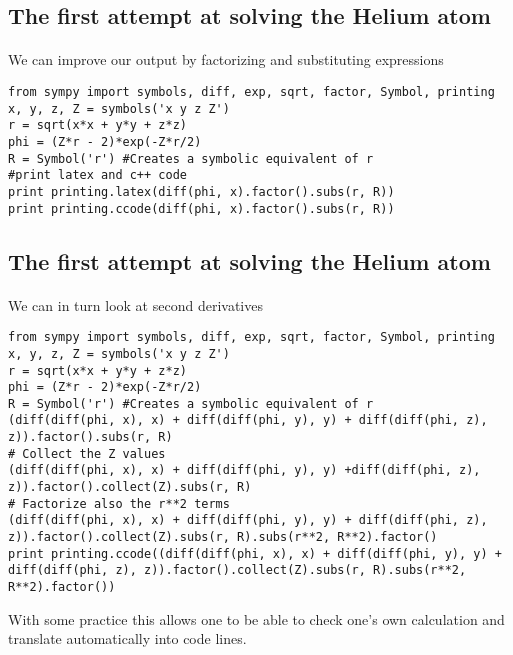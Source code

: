\documentclass[%
twoside,                 %
final,                   %
10pt]{article}
\begin{document}
\subsection*{The first attempt at solving the Helium atom}

\paragraph{}
We can improve our output by factorizing and substituting expressions
\begin{verbatim}
from sympy import symbols, diff, exp, sqrt, factor, Symbol, printing
x, y, z, Z = symbols('x y z Z')
r = sqrt(x*x + y*y + z*z)
phi = (Z*r - 2)*exp(-Z*r/2)
R = Symbol('r') #Creates a symbolic equivalent of r
#print latex and c++ code
print printing.latex(diff(phi, x).factor().subs(r, R))
print printing.ccode(diff(phi, x).factor().subs(r, R))
\end{verbatim}




\subsection*{The first attempt at solving the Helium atom}

\paragraph{}
We can in turn look at second derivatives
\begin{verbatim}
from sympy import symbols, diff, exp, sqrt, factor, Symbol, printing
x, y, z, Z = symbols('x y z Z')
r = sqrt(x*x + y*y + z*z)
phi = (Z*r - 2)*exp(-Z*r/2)
R = Symbol('r') #Creates a symbolic equivalent of r
(diff(diff(phi, x), x) + diff(diff(phi, y), y) + diff(diff(phi, z), z)).factor().subs(r, R)
# Collect the Z values
(diff(diff(phi, x), x) + diff(diff(phi, y), y) +diff(diff(phi, z), z)).factor().collect(Z).subs(r, R)
# Factorize also the r**2 terms
(diff(diff(phi, x), x) + diff(diff(phi, y), y) + diff(diff(phi, z), z)).factor().collect(Z).subs(r, R).subs(r**2, R**2).factor()
print printing.ccode((diff(diff(phi, x), x) + diff(diff(phi, y), y) + diff(diff(phi, z), z)).factor().collect(Z).subs(r, R).subs(r**2, R**2).factor())
\end{verbatim}
With some practice this allows one to be able to check one's own calculation and translate automatically into code lines.
\end{document}
